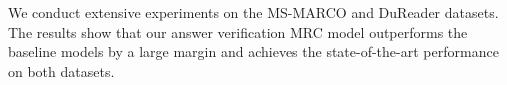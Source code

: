 We conduct extensive experiments on the MS-MARCO \cite{marco} and DuReader \cite{dureader} datasets. The results show that our answer verification MRC model outperforms the baseline models by a large margin and achieves the state-of-the-art performance on both datasets. 






%
%
%


